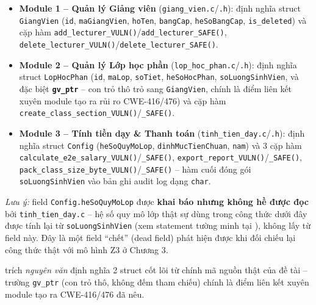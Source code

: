 \begin{itemize}
  \item \textbf{Module 1 -- Quản lý Giảng viên} (\texttt{giang\_vien.c}/\texttt{.h}): định nghĩa struct \texttt{GiangVien} (\texttt{id}, \texttt{maGiangVien}, \texttt{hoTen}, \texttt{bangCap}, \texttt{heSoBangCap}, \texttt{is\_deleted}) và cặp hàm \texttt{add\_lecturer\_VULN()}/\texttt{add\_lecturer\_SAFE()}, \texttt{delete\_lecturer\_VULN()}/\texttt{delete\_lecturer\_SAFE()}.
  \item \textbf{Module 2 -- Quản lý Lớp học phần} (\texttt{lop\_hoc\_phan.c}/\texttt{.h}): định nghĩa struct \texttt{LopHocPhan} (\texttt{id}, \texttt{maLop}, \texttt{soTiet}, \texttt{heSoHocPhan}, \texttt{soLuongSinhVien}, và đặc biệt \textbf{\texttt{gv\_ptr}} -- con trỏ thô trỏ sang \texttt{GiangVien}, chính là điểm liên kết xuyên module tạo ra rủi ro CWE-416/476) và cặp hàm \texttt{create\_class\_section\_VULN()}/\texttt{\_SAFE()}.
  \item \textbf{Module 3 -- Tính tiền dạy \& Thanh toán} (\texttt{tinh\_tien\_day.c}/\texttt{.h}): định nghĩa struct \texttt{Config} (\texttt{heSoQuyMoLop}, \texttt{dinhMucTienChuan}, \texttt{nam}) và 3 cặp hàm \texttt{calculate\_e2e\_salary\_VULN()}/\texttt{\_SAFE()}, \texttt{export\_report\_VULN()}/\texttt{\_SAFE()}, \texttt{pack\_class\_size\_byte\_VULN()}/\texttt{\_SAFE()} -- hàm cuối đóng gói \texttt{soLuongSinhVien} vào bản ghi audit log dạng \texttt{char}.
\end{itemize}

\noindent\textit{Lưu ý:} field \texttt{Config.heSoQuyMoLop} được \textbf{khai báo nhưng không hề được đọc} bởi \texttt{tinh\_tien\_day.c} -- hệ số quy mô lớp thật sự dùng trong công thức dưới đây được tính lại từ \texttt{soLuongSinhVien} (xem statement tường minh tại ), không lấy từ field này. Đây là một field ``chết'' (dead field) phát hiện được khi đối chiếu lại công thức thật với mô hình Z3 ở Chương 3.

 trích \emph{nguyên văn} định nghĩa 2 struct cốt lõi từ chính mã nguồn thật của đề tài -- trường \texttt{gv\_ptr} (con trỏ thô, không đếm tham chiếu) chính là điểm liên kết xuyên module tạo ra CWE-416/476 đã nêu.





